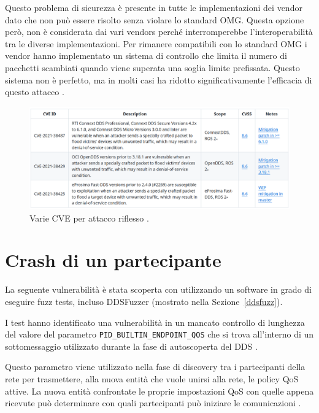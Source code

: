 Questo problema di sicurezza è presente in tutte le implementazioni 
dei vendor dato che non può essere risolto senza violare lo 
standard OMG. Questa opzione però, non è considerata dai vari 
vendors perché interromperebbe l'interoperabilità tra le 
diverse implementazioni.
Per rimanere compatibili con lo standard OMG i vendor hanno 
implementato un sistema di controllo che limita il numero 
di pacchetti scambiati quando viene superata una soglia limite
prefissata. Questo sistema non è perfetto, ma in molti casi ha 
ridotto significativamente l'efficacia di questo attacco \cite{mayoral2022robot}.

\begin{figure}[H]
    \centering
    \includegraphics[width=15.2cm, keepaspectratio]{img/CVErecoinnassance.png}
    \caption{Varie CVE per attacco riflesso \cite{mayoral2022robot}.}
    \label{CVErecoinnassance}
\end{figure}


\section{Crash di un partecipante}
La seguente vulnerabilità è stata scoperta con utilizzando 
un software in grado di eseguire fuzz tests, 
incluso DDSFuzzer (mostrato nella Sezione~\ref{ddsfuzz}).

I test hanno identificato una vulnerabilità in un mancato 
controllo di lunghezza del valore del parametro 
\texttt{PID\_BUILTIN\_ENDPOINT\_QOS} che si trova all'interno di 
un sottomessaggio utilizzato durante la fase di autoscoperta
del DDS \cite{mayoral2022robot}. 

Questo parametro viene 
utilizzato nella fase di discovery
tra i partecipanti della rete per trasmettere, 
alla nuova entità che vuole unirsi alla rete, le policy
QoS attive. La nuova entità confrontate 
le proprie impostazioni QoS con quelle appena ricevute
può determinare con quali partecipanti può iniziare le 
comunicazioni \cite{ddsrtps}.

